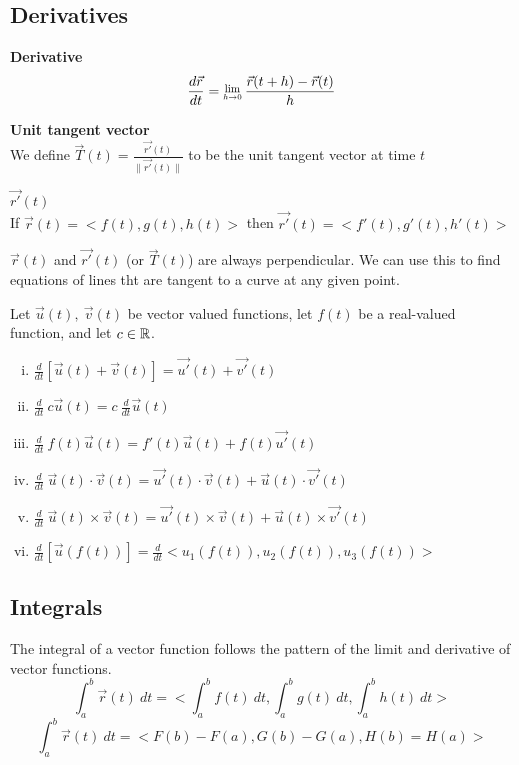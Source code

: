 \documentclass[12 pt]{article}
\begin{document}
		\subsection{Derivatives}
		\begin{def*}\textbf{Derivative}\\
			$$\frac{d\vec{r}}{dt}=\Lim{h\rightarrow 0}\frac{\vec{r}(t+h)-\vec{r}(t)}{h}$$
		\end{def*}
		\begin{def*}\textbf{Unit tangent vector}\\
			We define $\vec{T}(t)=\frac{\vec{r'}(t)}{\parallel\vec{r'}(t)\parallel}$ to be the unit tangent vector at time $t$
		\end{def*}
		\begin{thrm}\textbf{$\vec{r'}(t)$}\\
			If $\vec{r}(t)=<f(t),g(t),h(t)>$ then $\vec{r'}(t)=<f'(t),g'(t),h'(t)>$
		\end{thrm}
		$\vec{r}(t)$ and $\vec{r'}(t)$ (or $\vec{T}(t)$) are always perpendicular. We can use this to find equations of lines tht are tangent to a curve at any given point.
		\begin{thrm}Let $\vec{u}(t),\ \vec{v}(t)$ be vector valued functions, let $f(t)$ be a real-valued function, and let $c\in\mathbb{R}$.
			\begin{enumerate}[i)]
				\item $\frac{d}{dt}[\vec{u}(t)+\vec{v}(t)]=\vec{u'}(t)+\vec{v'}(t)$
				\item $\frac{d}{dt}\ c\vec{u}(t)=c\ \frac{d}{dt}\vec{u}(t)$
				\item $\frac{d}{dt}\ f(t)\vec{u}(t)=f'(t)\vec{u}(t)+f(t)\vec{u'}(t)$
				\item $\frac{d}{dt}\ \vec{u}(t)\cdot\vec{v}(t)=\vec{u'}(t)\cdot\vec{v}(t)+\vec{u}(t)\cdot\vec{v'}(t)$
				\item $\frac{d}{dt}\ \vec{u}(t)\times\vec{v}(t)=\vec{u'}(t)\times\vec{v}(t)+\vec{u}(t)\times\vec{v'}(t)$
				\item $\frac{d}{dt} [\vec{u}(f(t))]=\frac{d}{dt}<u_1(f(t)),u_2(f(t)),u_3(f(t))>$
			\end{enumerate}
		\end{thrm}

		\subsection{Integrals}
		The integral of a vector function follows the pattern of the limit and derivative of vector functions.
		$$\int_a^b\vec{r}(t)\ dt=<\int_a^bf(t)\ dt,\int_a^bg(t)\ dt,\int_a^bh(t)\ dt>$$
		$$\int_a^b\vec{r}(t)\ dt=<F(b)-F(a),G(b)-G(a),H(b)=H(a)>$$
\end{document}
